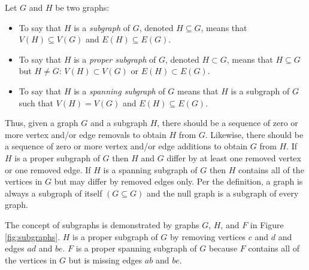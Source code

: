 \begin{definition}[Subgraph]
  Let \(G\) and \(H\) be two graphs:
  \begin{itemize}
  \item To say that \(H\) is a \emph{subgraph} of \(G\), denoted \(H\subseteq G\), means that \(V(H)\subseteq V(G)\)
    and \(E(H)\subseteq E(G)\).
  \item To say that \(H\) is a \emph{proper subgraph} of \(G\), denoted \(H\subset G\), means that \(H\subseteq G\)
    but \(H\ne G\): \(V(H)\subset V(G)\) or \(E(H)\subset E(G)\).
  \item To say that \(H\) is a \emph{spanning subgraph} of \(G\) means that \(H\) is a subgraph of \(G\) such that
    \(V(H)=V(G)\) and \(E(H)\subseteq E(G)\).
  \end{itemize}
\end{definition}

Thus, given a graph \(G\) and a subgraph \(H\), there should be a sequence of zero or more vertex and/or edge
removals to obtain \(H\) from \(G\).  Likewise, there should be a sequence of zero or more vertex and/or edge
additions to obtain \(G\) from \(H\).  If \(H\) is a proper subgraph of \(G\) then \(H\) and \(G\) differ by at
least one removed vertex or one removed edge.  If \(H\) is a spanning subgraph of \(G\) then \(H\) contains all of
the vertices in \(G\) but may differ by removed edges only.  Per the definition, a graph is always a subgraph of
itself \((G\subseteq G)\) and the null graph is a subgraph of every graph.

The concept of subgraphs is demonstrated by graphs \(G\), \(H\), and \(F\) in Figure \ref{fig:subgraphs}.  \(H\) is
a proper subgraph of \(G\) by removing vertices \(c\) and \(d\) and edges \(ad\) and \(be\).  \(F\) is a proper
spanning subgraph of \(G\) because \(F\) contains all of the vertices in \(G\) but is missing edges \(ab\) and
\(be\).

